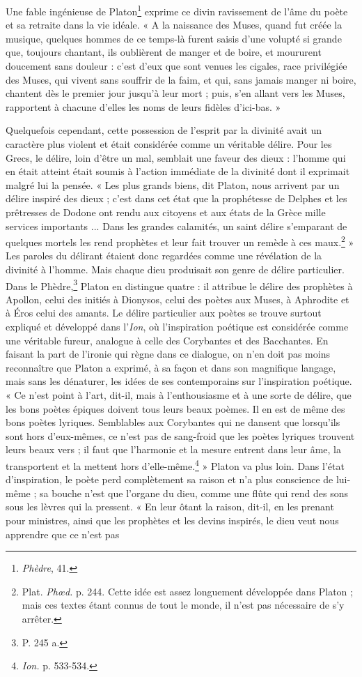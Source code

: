\documentclass[a4paper, 11pt, oneside, polutonikogreek, french]{article}
\begin{document}
Une fable ingénieuse de Platon\footnote{\emph{Phèdre}, 41.} exprime ce divin ravissement de l'âme du poète et sa retraite dans la vie idéale. « A la naissance des Muses, quand fut créée la musique, quelques hommes de ce temps-là furent saisis d'une volupté si grande que, toujours chantant, ils oublièrent de manger et de boire, et moururent doucement sans douleur : c'est d'eux que sont venues les cigales, race privilégiée des Muses, qui vivent sans souffrir de la faim, et qui, sans jamais manger ni boire, chantent dès le premier jour jusqu'à leur mort ; puis, s'en allant vers les Muses, rapportent à chacune d'elles les noms de leurs fidèles d'ici-bas. »

Quelquefois cependant, cette possession de l'esprit par la divinité avait un caractère plus violent et était considérée comme un véritable délire. Pour les Grecs, le délire, loin d'être un mal, semblait une faveur des dieux : l'homme qui en était atteint était soumis à l'action immédiate de la divinité dont il exprimait malgré lui la pensée. « Les plus grands biens, dit Platon, nous arrivent par un délire inspiré des dieux ; c'est dans cet état que la prophétesse de Delphes et les prêtresses de Dodone ont rendu aux citoyens et aux états de la Grèce mille services importants ... Dans les grandes calamités, un saint délire s'emparant de quelques mortels les rend prophètes et leur fait trouver un remède à ces maux.\footnote{Plat. \emph{Phœd.} p. 244. Cette idée est assez longuement développée dans Platon ; mais ces textes étant connus de tout le monde, il n'est pas nécessaire de s'y arrêter.} » Les paroles du délirant étaient donc regardées comme une révélation de la divinité à l'homme. Mais chaque dieu produisait son genre de délire particulier. Dans le Phèdre,\footnote{P. 245 a.} Platon en distingue quatre : il attribue le délire des prophètes à Apollon, celui des initiés à Dionysos, celui des poètes aux Muses, à Aphrodite et à Éros celui des amants. Le délire particulier aux poètes se trouve surtout expliqué et développé dans l'\emph{Ion}, où l'inspiration poétique est considérée comme une véritable fureur, analogue à celle des Corybantes et des Bacchantes. En faisant la part de l'ironie qui règne dans ce dialogue, on n'en doit pas moins reconnaître que Platon a exprimé, à sa façon et dans son magnifique langage, mais sans les dénaturer, les idées de ses contemporains sur l'inspiration poétique. « Ce n'est point à l'art, dit-il, mais à l'enthousiasme et à une sorte de délire, que les bons poètes épiques doivent tous leurs beaux poèmes. Il en est de même des bons poètes lyriques. Semblables aux Corybantes qui ne dansent que lorsqu'ils sont hors d'eux-mêmes, ce n'est pas de sang-froid que les poètes lyriques trouvent leurs beaux vers ; il faut que l'harmonie et la mesure entrent dans leur âme, la transportent et la mettent hors d'elle-même.\footnote{\emph{Ion.} p. 533-534.} » Platon va plus loin. Dans l'état d'inspiration, le poète perd complètement sa raison et n'a plus conscience de lui-même ; sa bouche n'est que l'organe du dieu, comme une flûte qui rend des sons sous les lèvres qui la pressent. « En leur ôtant la raison, dit-il, en les prenant pour ministres, ainsi que les prophètes et les devins inspirés, le dieu veut nous apprendre que ce n'est pas 
\end{document}
